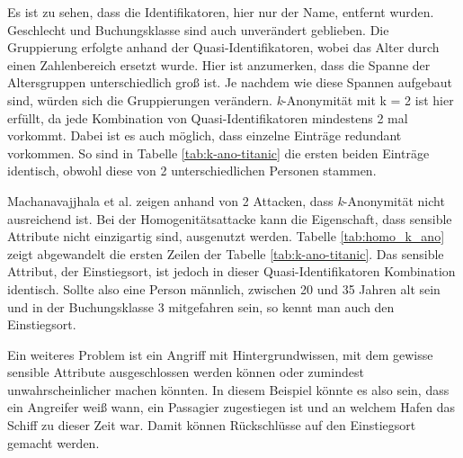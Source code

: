 

Es ist zu sehen, dass die Identifikatoren, hier nur der Name, entfernt wurden.
Geschlecht und Buchungsklasse sind auch unverändert geblieben.
Die Gruppierung erfolgte anhand der Quasi-Identifikatoren, wobei das Alter durch einen Zahlenbereich ersetzt wurde.
Hier ist anzumerken, dass die Spanne der Altersgruppen unterschiedlich groß ist. 
Je nachdem wie diese Spannen aufgebaut sind, würden sich die Gruppierungen verändern.
\textit{k}-Anonymität mit k = 2 ist hier erfüllt, da jede Kombination von Quasi-Identifikatoren mindestens 2 mal vorkommt.
Dabei ist es auch möglich, dass einzelne Einträge redundant vorkommen. 
So sind in Tabelle \ref{tab:k-ano-titanic} die ersten beiden Einträge identisch, obwohl diese von 2 unterschiedlichen Personen stammen.

Machanavajjhala et al. \cite{P-24} zeigen anhand von 2 Attacken, dass \textit{k}-Anonymität nicht ausreichend ist.
Bei der Homogenitätsattacke kann die Eigenschaft, dass sensible Attribute nicht einzigartig sind, ausgenutzt werden.
Tabelle \ref{tab:homo_k_ano} zeigt abgewandelt die ersten Zeilen der Tabelle \ref{tab:k-ano-titanic}.
Das sensible Attribut, der Einstiegsort, ist jedoch in dieser Quasi-Identifikatoren Kombination identisch.
Sollte also eine Person männlich, zwischen 20 und 35 Jahren alt sein und in der Buchungsklasse 3 mitgefahren sein, so kennt man auch den Einstiegsort.


Ein weiteres Problem ist ein Angriff mit Hintergrundwissen, mit dem gewisse sensible Attribute ausgeschlossen werden können oder zumindest unwahrscheinlicher machen könnten.
In diesem Beispiel könnte es also sein, dass ein Angreifer weiß wann, ein Passagier zugestiegen ist und an welchem Hafen das Schiff zu dieser Zeit war. 
Damit können Rückschlüsse auf den Einstiegsort gemacht werden.

